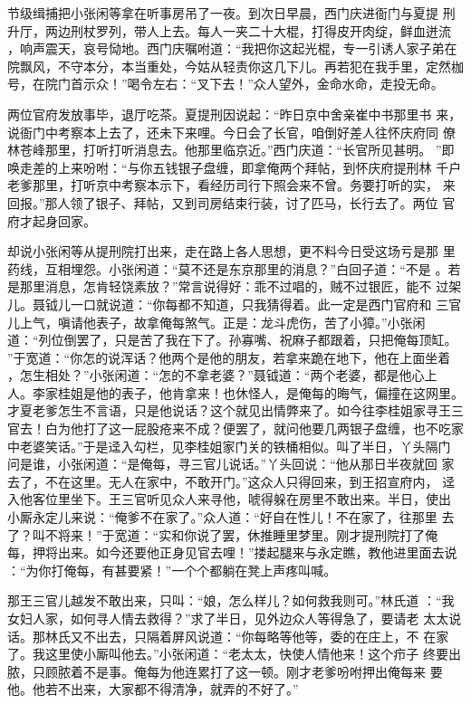 节级缉捕把小张闲等拿在听事房吊了一夜。到次日早晨，西门庆进衙门与夏提
刑升厅，两边刑杖罗列，带人上去。每人一夹二十大棍，打得皮开肉绽，鲜血迸流
，响声震天，哀号恸地。西门庆嘱咐道：“我把你这起光棍，专一引诱人家子弟在
院飘风，不守本分，本当重处，今姑从轻责你这几下儿。再若犯在我手里，定然枷
号，在院门首示众！”喝令左右：“叉下去！”众人望外，金命水命，走投无命。

两位官府发放事毕，退厅吃茶。夏提刑因说起：“昨日京中舍亲崔中书那里书
来，说衙门中考察本上去了，还未下来哩。今日会了长官，咱倒好差人往怀庆府同
僚林苍峰那里，打听打听消息去。他那里临京近。”西门庆道：“长官所见甚明。
”即唤走差的上来吩咐：“与你五钱银子盘缠，即拿俺两个拜帖，到怀庆府提刑林
千户老爹那里，打听京中考察本示下，看经历司行下照会来不曾。务要打听的实，
来回报。”那人领了银子、拜帖，又到司房结束行装，讨了匹马，长行去了。两位
官府才起身回家。

却说小张闲等从提刑院打出来，走在路上各人思想，更不料今日受这场亏是那
里药线，互相埋怨。小张闲道：“莫不还是东京那里的消息？”白回子道：“不是
。若是那里消息，怎肯轻饶素放？”常言说得好：乖不过唱的，贼不过银匠，能不
过架儿。聂钺儿一口就说道：“你每都不知道，只我猜得着。此一定是西门官府和
三官儿上气，嗔请他表子，故拿俺每煞气。正是：龙斗虎伤，苦了小獐。”小张闲
道：“列位倒罢了，只是苦了我在下了。孙寡嘴、祝麻子都跟着，只把俺每顶缸。
”于宽道：“你怎的说浑话？他两个是他的朋友，若拿来跪在地下，他在上面坐着
，怎生相处？”小张闲道：“怎的不拿老婆？”聂钺道：“两个老婆，都是他心上
人。李家桂姐是他的表子，他肯拿来！也休怪人，是俺每的晦气，偏撞在这网里。
才夏老爹怎生不言语，只是他说话？这个就见出情弊来了。如今往李桂姐家寻王三
官去！白为他打了这一屁股疮来不成？便罢了，就问他要几两银子盘缠，也不吃家
中老婆笑话。”于是迳入勾栏，见李桂姐家门关的铁桶相似。叫了半日，丫头隔门
问是谁，小张闲道：“是俺每，寻三官儿说话。”丫头回说：“他从那日半夜就回
家去了，不在这里。无人在家中，不敢开门。”这众人只得回来，到王招宣府内，
迳入他客位里坐下。王三官听见众人来寻他，唬得躲在房里不敢出来。半日，使出
小厮永定儿来说：“俺爹不在家了。”众人道：“好自在性儿！不在家了，往那里
去了？叫不将来！”于宽道：“实和你说了罢，休推睡里梦里。刚才提刑院打了俺
每，押将出来。如今还要他正身见官去哩！”搂起腿来与永定瞧，教他进里面去说
：“为你打俺每，有甚要紧！”一个个都躺在凳上声疼叫喊。

那王三官儿越发不敢出来，只叫：“娘，怎么样儿？如何救我则可。”林氏道
：“我女妇人家，如何寻人情去救得？”求了半日，见外边众人等得急了，要请老
太太说话。那林氏又不出去，只隔着屏风说道：“你每略等他等，委的在庄上，不
在家了。我这里使小厮叫他去。”小张闲道：“老太太，快使人情他来！这个疖子
终要出脓，只顾脓着不是事。俺每为他连累打了这一顿。刚才老爹吩咐押出俺每来
要他。他若不出来，大家都不得清净，就弄的不好了。”

